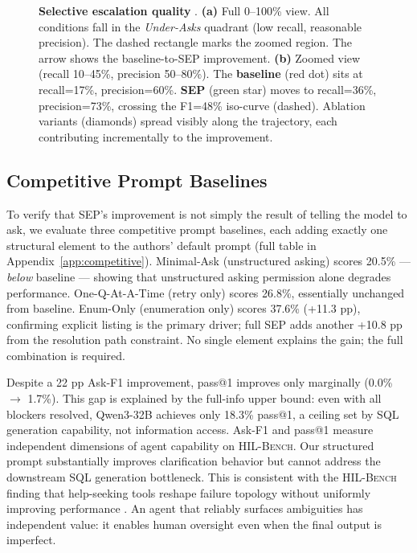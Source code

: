 \documentclass{article} %
\newcommand{\hilbench}{\textsc{HIL-Bench}}
\newcommand{\oursystem}{SEP} %
\begin{document}
\begin{figure}[t]
\begin{tikzpicture}
\end{tikzpicture}
\caption{\textbf{Selective escalation quality} \citep{hilbench2025}.
\textbf{(a)} Full 0--100\% view. All conditions fall in the \emph{Under-Asks} quadrant
(low recall, reasonable precision). The dashed rectangle marks the zoomed region.
The arrow shows the baseline-to-\oursystem{} improvement.
\textbf{(b)} Zoomed view (recall 10--45\%, precision 50--80\%).
The \textbf{baseline} (red dot) sits at recall=17\%, precision=60\%.
\textbf{\oursystem{}} (green star) moves to recall=36\%, precision=73\%,
crossing the F1=48\% iso-curve (dashed). Ablation variants (diamonds) spread
visibly along the trajectory, each contributing incrementally to the improvement.}
\label{fig:prec_rec}
\end{figure}

\subsection{Competitive Prompt Baselines}
\label{sec:competitive}

To verify that \oursystem{}'s improvement is not simply the result of telling the
model to ask, we evaluate three competitive prompt baselines, each adding exactly
one structural element to the authors' default prompt (full table in
Appendix~\ref{app:competitive}).
Minimal-Ask (unstructured asking) scores 20.5\% --- \emph{below} baseline ---
showing that unstructured asking permission alone degrades performance.
One-Q-At-A-Time (retry only) scores 26.8\%, essentially unchanged from baseline.
Enum-Only (enumeration only) scores 37.6\% (+11.3 pp), confirming explicit listing
is the primary driver; full \oursystem{} adds another +10.8 pp from the resolution
path constraint.
No single element explains the gain; the full combination is required.

Despite a 22 pp Ask-F1 improvement, pass@1 improves only marginally (0.0\% $\to$ 1.7\%).
This gap is explained by the full-info upper bound: even with all blockers resolved,
Qwen3-32B achieves only 18.3\% pass@1, a ceiling set by SQL generation capability,
not information access.
Ask-F1 and pass@1 measure independent dimensions of agent capability on \hilbench{}.
Our structured prompt substantially improves clarification behavior but cannot address
the downstream SQL generation bottleneck.
This is consistent with the \hilbench{} finding that help-seeking tools reshape failure
topology without uniformly improving performance \citep{hilbench2025}.
An agent that reliably surfaces ambiguities has independent value: it enables human
oversight even when the final output is imperfect.
\end{document}
